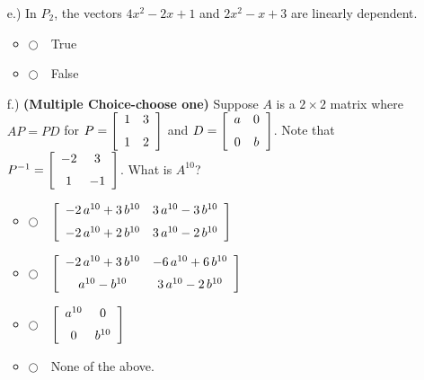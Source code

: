 \documentclass[12pt]{extarticle}
\newcommand{\chooseone}{{\Large$\Circle$\ \ }}
\begin{document}
\begin{enumerate}
\begin{itemize}
\item[e.) ] In $P_2$, the vectors $4x^2-2x+1$ and $2x^2-x+3$ are linearly dependent.

\begin{itemize}[label={}] 
\item \chooseone True
\item \chooseone False
\end{itemize}


\newpage

\item[f.)] \textbf{(Multiple Choice-choose one)} Suppose $A$ is a $2\times 2$ matrix where $AP=PD$ for $P= \left[ \begin {array}{cc} 1&3\\ \noalign{\medskip}1&2\end {array}
 \right]$ and $D= \left[ \begin {array}{cc} a&0\\ \noalign{\medskip}0&b\end {array}
 \right]$. Note that $ P^{-1}=\left[ \begin {array}{cc} -2&3\\ \noalign{\medskip}1&-1\end {array}
 \right]$.  What is $A^{10}$?
\begin{itemize}[label={}] 
\item \chooseone $\left[ \begin {array}{cc} -2\,{a}^{10}+3\,{b}^{10}&3\,{a}^{10}-3\,{b}^{10}\\ \noalign{\medskip}-2\,{a}^{10}+2\,{b}^{10}&3\,{a}^{10}-2\,{b}^{10}\end {array} \right]$\vspace{0.1cm}
\item \chooseone $\left[ \begin {array}{cc} -2\,{a}^{10}+3\,{b}^{10}&-6\,{a}^{10}+6\,{b}^{10}\\ \noalign{\medskip}{a}^{10}-{b}^{10}&3\,{a}^{10}-2\,{b}^{10}\end {array} \right]$\vspace{0.1cm}
\item  \chooseone $\left[ \begin {array}{cc} {a}^{10}&0\\ \noalign{\medskip}0&{b}^{10}\end {array} \right]$\vspace{0.1cm}
\item \chooseone  None of the above.
\end{itemize}
   


\end{itemize}
\end{enumerate}
\end{document}
